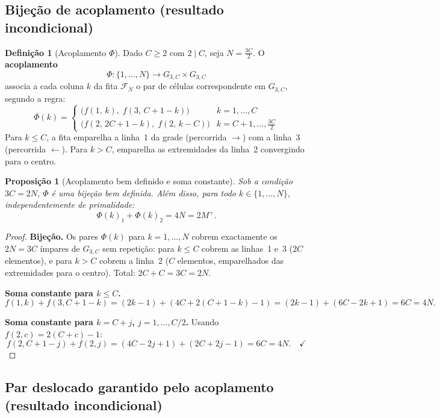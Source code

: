 \documentclass[12pt, a4paper]{article}
\theoremstyle{plain}
\newtheorem{proposition}[theorem]{Proposição}
\theoremstyle{definition}
\newtheorem{definition}[theorem]{Definição}
\theoremstyle{remark}
\begin{document}
	\subsection{Bijeção de acoplamento (resultado incondicional)}
	
	\begin{definition}[Acoplamento $\Phi$]
		\label{def:phi}
		Dado $C\geq2$ com $2\mid C$, seja $N=\frac{3C}{2}$.
		O \textbf{acoplamento}
		\[
		\Phi: \{1,\ldots,N\} \longrightarrow G_{3,C}\times G_{3,C}
		\]
		associa a cada coluna $k$ da fita $\mathcal{F}_N$ o par de células
		correspondente em $G_{3,C}$, segundo a regra:
		\[
		\Phi(k) = \begin{cases}
			\bigl(f(1,\,k),\; f(3,\,C+1-k)\bigr)
			& k = 1,\ldots,C\\[6pt]
			\bigl(f(2,\,2C+1-k),\; f(2,\,k-C)\bigr)
			& k = C+1,\ldots,\tfrac{3C}{2}
		\end{cases}
		\]
		Para $k\leq C$, a fita emparelha a linha~1 da grade
		(percorrida $\rightarrow$) com a linha~3 (percorrida
		$\leftarrow$).  Para $k>C$, emparelha as extremidades da linha~2
		convergindo para o centro.
	\end{definition}
	
	\begin{proposition}[Acoplamento bem definido e soma constante]
		\label{prop:phi}
		Sob a condição $3C=2N$, $\Phi$ é uma bijeção bem definida.
		Além disso, para todo $k\in\{1,\ldots,N\}$, independentemente
		de primalidade:
		\[
		\Phi(k)_1 + \Phi(k)_2 = 4N = 2M^+.
		\]
	\end{proposition}
	
	\begin{proof}
		\textbf{Bijeção.}  Os pares $\Phi(k)$ para $k=1,\ldots,N$ cobrem
		exactamente os $2N=3C$ ímpares de $G_{3,C}$ sem repetição: para
		$k\leq C$ cobrem as linhas~1 e~3 ($2C$ elementos), e para $k>C$
		cobrem a linha~2 ($C$ elementos, emparelhados das extremidades
		para o centro).  Total: $2C+C=3C=2N$. \checkmark
		
		\textbf{Soma constante para $k\leq C$.}
		\[
		f(1,k)+f(3,C+1-k) = (2k-1)+(4C+2(C+1-k)-1)
		= (2k-1)+(6C-2k+1) = 6C = 4N.
		\]
		
		\textbf{Soma constante para $k=C+j$, $j=1,\ldots,C/2$.}
		Usando $f(2,c)=2(C+c)-1$:
		\[
		f(2,C+1-j)+f(2,j)
		= (4C-2j+1)+(2C+2j-1) = 6C = 4N. \quad\checkmark
		\]
	\end{proof}
	
	\subsection{Par deslocado garantido pelo acoplamento
		(resultado incondicional)}
	
\end{document}
